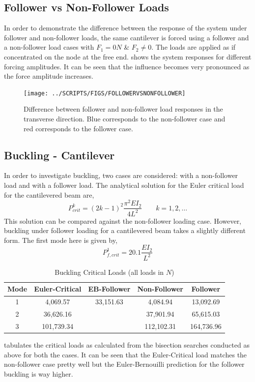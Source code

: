 \documentclass[10pt]{article}
\begin{document}
\subsection{Follower vs Non-Follower Loads}
\label{sec:follower-vs-non}

In order to demonstrate the difference between the response of the
system under follower and non-follower loads, the same cantilever is
forced using a follower and a non-follower load cases with $F_1=0N$
\& $F_2\neq 0$. The loads are applied as if concentrated on the node
at the free end.  shows the system
responses for different forcing amplitudes. It can be seen that the
influence becomes very pronounced as the force amplitude increases. 

\begin{figure}[!h]
  \centering
  \texttt{[image: ../SCRIPTS/FIGS/FOLLOWERVSNONFOLLOWER]}
  \caption{Difference between follower and non-follower load responses
    in the transverse direction. Blue corresponds to the non-follower
    case and red corresponds to the follower case.}
  \label{fig:followervsnonfollower}
\end{figure}

\subsection{Buckling - Cantilever}
\label{sec:buckling-cant}

In order to investigate buckling, two cases are considered: with a
non-follower load and with a follower load. The analytical solution
for the Euler critical load for the cantilevered beam are,
$$ P_{crit}^k = {(2k-1)}^2\frac{\pi^2 EI_2}{4L^2}\qquad k=1, 2,
\dots $$
This solution can be compared against the non-follower loading
case. However, buckling under follower loading for a cantilevered beam
takes a slightly different form. The first mode here is given by,
$$ P_{f,crit}^1 = 20.1\frac{EI_2}{L^2} $$
\begin{table}[!h]
  \centering
  \begin{tabular}{ccccc}
    \hline\hline
    Mode & Euler-Critical & EB-Follower & Non-Follower & Follower\\\hline
    1 & 4,069.57 & 33,151.63 & 4,084.94 & 13,092.69 \\
    2 & 36,626.16 & & 37,901.94 & 65,615.03 \\
    3 & 101,739.34 & & 112,102.31 & 164,736.96 \\\hline\hline
  \end{tabular}
  \caption{Buckling Critical Loads (all loads in $N$)}
  \label{tab:bucklcrit}
\end{table}
 tabulates the critical loads as calculated from
the bisection searches conducted as above for both the cases. It can
be seen that the Euler-Critical load matches the non-follower case
pretty well but the Euler-Bernouilli prediction for the follower
buckling is way higher.
\end{document}

